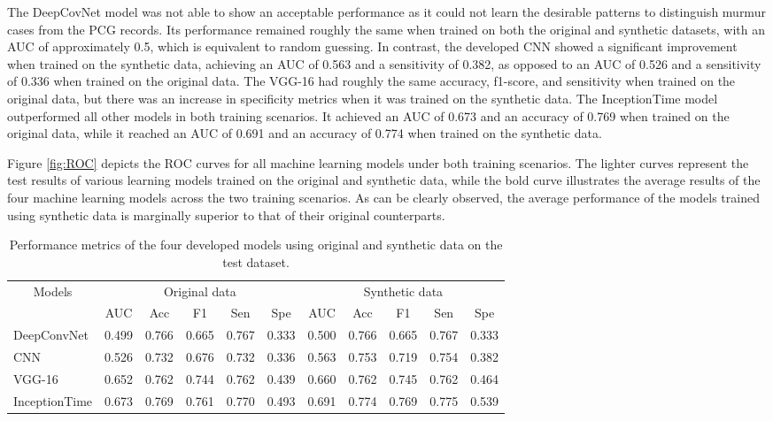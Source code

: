\documentclass{article}
\begin{document}
\par The DeepCovNet model was not able to show an acceptable performance as it could not learn the desirable patterns to distinguish murmur cases from the PCG records. Its performance remained roughly the same when trained on both the original and synthetic datasets, with an AUC of approximately 0.5, which is equivalent to random guessing. In contrast, the developed CNN showed a significant improvement when trained on the synthetic data, achieving an AUC of 0.563 and a sensitivity of 0.382, as opposed to an AUC of 0.526 and a sensitivity of 0.336 when trained on the original data. The VGG-16 had roughly the same accuracy, f1-score, and sensitivity when trained on the original data, but there was an increase in specificity metrics when it was trained on the synthetic data. The InceptionTime model outperformed all other models in both training scenarios. It achieved an AUC of 0.673 and an accuracy of 0.769 when trained on the original data, while it reached an AUC of 0.691 and an accuracy of 0.774 when trained on the synthetic data.

\par Figure \ref{fig:ROC} depicts the ROC curves for all machine learning models under both training scenarios. The lighter curves represent the test results of various learning models trained on the original and synthetic data, while the bold curve illustrates the average results of the four machine learning models across the two training scenarios. As can be clearly observed, the average performance of the models trained using synthetic data is marginally superior to that of their original counterparts.

\begin{table}[]
\centering
\caption{Performance metrics of the four developed models using original and synthetic data on the test dataset.}
\label{tab:PF}
\begin{tabular}{|l|c|c|c|c|c|c|c|c|c|c|} 
\hline
\multicolumn{1}{|c|}{\multirow{2}{*}{Models}} & \multicolumn{5}{c|}{Original data} & \multicolumn{5}{c|}{Synthetic data} \\ \cline{2-11} 
\multicolumn{1}{|c|}{}                        & AUC  & Acc  & F1 & Sen & Spe & AUC   & Acc   & F1   & Sen  & Spe  \\ \hline
DeepConvNet                                          &0.499      &0.766       &0.665    &0.767     &0.333     &0.500       &0.766        &0.665      &0.767      &0.333      \\ \hline
CNN                                &      0.526&       0.732&    0.676&     0.732&     0.336&       0.563&        0.753&      0.719&      0.754& 0.382      \\ \hline
VGG-16                                        & 0.652      &0.762       &0.744    &0.762     &0.439     &0.660       &0.762        &0.745      &0.762      &0.464      \\ \hline
InceptionTime                                   & 0.673      &0.769       &0.761    &0.770     &0.493     &0.691       &0.774        &0.769      &0.775      &0.539 \\ \hline

\end{tabular}
\end{table}
\end{document}
